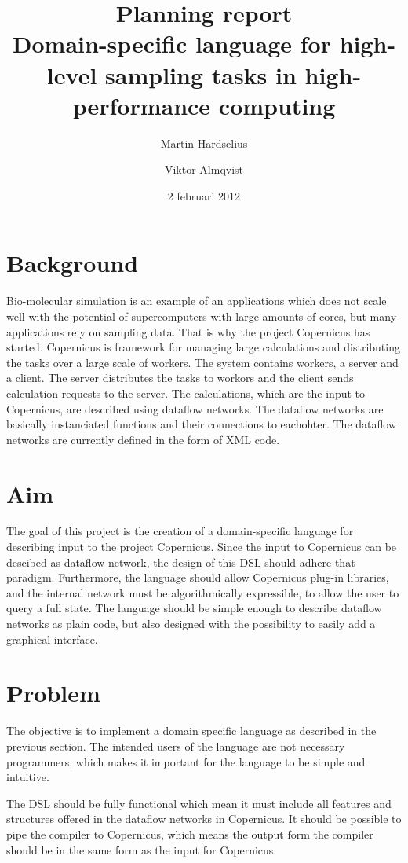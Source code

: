 \documentclass[a4paper]{article}
\title{Planning report\\
  \large{Domain-specific language for high-level
  sampling tasks in high-performance computing
  }
}
\author{Martin Hardselius \and Viktor Almqvist}
\date{2 februari 2012}
\begin{document}
\maketitle
\newpage

\section{Background}

Bio-molecular simulation is an example of an applications which does
not scale well with the potential of supercomputers with large amounts
of cores, but many applications rely on sampling data. That is why the
project Copernicus has started. Copernicus is framework for managing
large calculations and distributing the tasks over a large scale of
workers. The system contains workers, a server and a client. The
server distributes the tasks to workors and the client sends
calculation requests to the server. The calculations, which are the
input to Copernicus, are described using dataflow networks. The
dataflow networks are basically instanciated functions and their
connections to eachohter. The dataflow networks are currently defined
in the form of XML code.


\section{Aim}
The goal of this project is the creation of a domain-specific language
for describing input to the project Copernicus. Since the input to
Copernicus can be descibed as dataflow network, the design of this
DSL should adhere that paradigm. Furthermore, the language should
allow Copernicus plug-in libraries, and the internal network must be
algorithmically expressible, to allow the user to query a full
state. The language should be simple enough to describe dataflow
networks as plain code, but also designed with the possibility to
easily add a graphical interface.

\section{Problem}

The objective is to implement a domain specific language as described
in the previous section. The intended users of the language are not
necessary programmers, which makes it important for the language to be
simple and intuitive.

The DSL should be fully functional which mean it must include all
features and structures offered in the dataflow networks in
Copernicus. It should be possible to pipe the compiler to Copernicus,
which means the output form the compiler should be in the same form as
the input for Copernicus.
\end{document}
